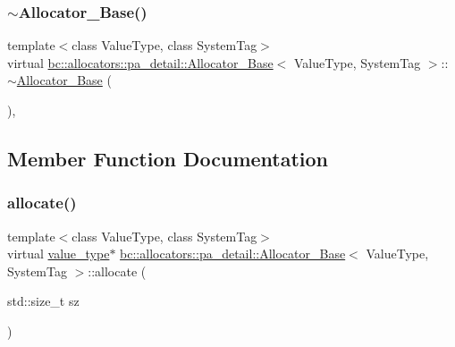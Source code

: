 \subsubsection{\texorpdfstring{$\sim$\+Allocator\+\_\+\+Base()}{~Allocator\_Base()}}
{\footnotesize\ttfamily template$<$class Value\+Type, class System\+Tag$>$ \\
virtual \hyperlink{structbc_1_1allocators_1_1pa__detail_1_1Allocator__Base}{bc\+::allocators\+::pa\+\_\+detail\+::\+Allocator\+\_\+\+Base}$<$ Value\+Type, System\+Tag $>$\+::$\sim$\hyperlink{structbc_1_1allocators_1_1pa__detail_1_1Allocator__Base}{Allocator\+\_\+\+Base} (\begin{DoxyParamCaption}{ }\end{DoxyParamCaption})\hspace{0.3cm}{\ttfamily [inline]}, {\ttfamily [virtual]}}



\subsection{Member Function Documentation}
\mbox{\label{structbc_1_1allocators_1_1pa__detail_1_1Allocator__Base_aa22794436cb3abefc059bde0eb08a23f}} 
\subsubsection{\texorpdfstring{allocate()}{allocate()}}
{\footnotesize\ttfamily template$<$class Value\+Type, class System\+Tag$>$ \\
virtual \hyperlink{structbc_1_1allocators_1_1pa__detail_1_1Allocator__Base_afb5e955c647a4b6742010e2790398b1c}{value\+\_\+type}$\ast$ \hyperlink{structbc_1_1allocators_1_1pa__detail_1_1Allocator__Base}{bc\+::allocators\+::pa\+\_\+detail\+::\+Allocator\+\_\+\+Base}$<$ Value\+Type, System\+Tag $>$\+::allocate (\begin{DoxyParamCaption}\item[{std\+::size\+\_\+t}]{sz }\end{DoxyParamCaption})\hspace{0.3cm}{\ttfamily [pure virtual]}}



